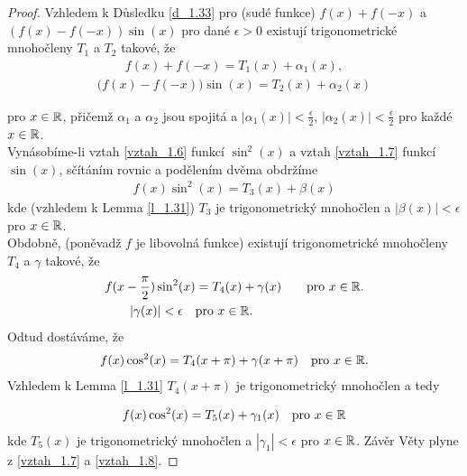 \begin{proof}
Vzhledem k Důsledku \ref{d_1.33} pro (sudé funkce) $f(x)+f(-x)$ a $(f(x)-f(-x))\sin(x)$ pro dané $\epsilon>0$ existují trigonometrické mnohočleny $T_1$ a $T_2$ takové, že 
\begin{align}
f(x)+f(-x)=T_1(x)+\alpha_1(x),
\label{vztah_1.6}
\end{align}
\begin{align}
\Big(f(x)-f(-x)\Big)\sin(x)=T_2(x)+\alpha_2(x)
\label{vztah_1.7}
\end{align}


pro $x \in \mathbb{R}$, přičemž $\alpha_1$ a $\alpha_2$ jsou spojitá a $|\alpha_1(x)| < \frac{\epsilon}{2}$, $|\alpha_2(x)| < \frac{\epsilon}{2}$ pro každé $x \in \mathbb{R}$. \\

Vynásobíme-li vztah \eqref{vztah_1.6} funkcí $\sin^2(x)$ a vztah \eqref{vztah_1.7} funkcí $\sin(x)$, sčítáním rovnic a podělením dvěma obdržíme
\begin{align}
f(x) \sin^2(x)=T_3(x) + \beta(x)
\end{align}
kde (vzhledem k Lemma \ref{l_1.31}) $T_3$ je trigonometrický mnohočlen a $|\beta(x)|< \epsilon$ pro $x \in \mathbb{R}$. \\
Obdobně, (poněvadž $f$ je libovolná funkce) existují trigonometrické mnohočleny $T_4$ a $\gamma$ takové, že 
\begin{align*}
f(x-\frac{\pi}{2})\sin^2(x)&=T_4(x) + \gamma (x) \quad &\text{pro $x \in \mathbb{R}$.} \\
|\gamma(x)|<\epsilon \quad & \text{pro $x \in \mathbb{R}$.}
\end{align*}
Odtud dostáváme, že 
\begin{align*}
f(x) \cos^2(x) = T_4(x+\pi)+\gamma(x+\pi) \quad \text{pro $x \in \mathbb{R}$.}
\end{align*}
Vzhledem k Lemma \ref{l_1.31} $T_4(x+\pi)$ je trigonometrický mnohočlen a tedy 

\begin{align}
f(x) \cos^2(x)=T_5(x)+\gamma_1(x) \quad \text{pro $x \in \mathbb{R}$}
\label{vztah_1.8}
\end{align}
kde $T_5(x)$ je trigonometrický mnohočlen a $|\gamma_1|<\epsilon$ pro $x \in \mathbb{R}$.
Závěr Věty plyne z \eqref{vztah_1.7} a \eqref{vztah_1.8}.
\end{proof}
